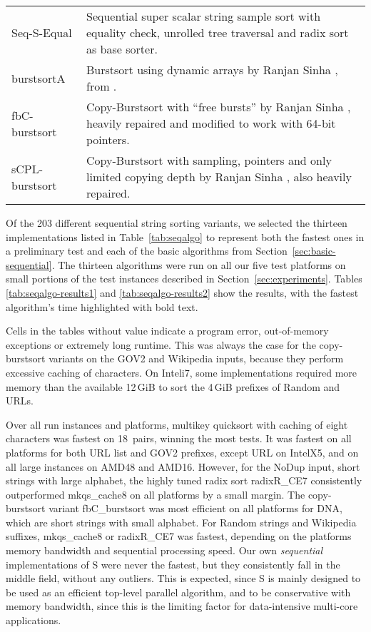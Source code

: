 \documentclass[a4paper]{myjournal}
\begin{document}
\begin{table}[tb]
\begin{tabularx}{\linewidth}{l|X}
Seq-S-Equal  & Sequential super scalar string sample sort with equality check, unrolled tree traversal and radix sort as base sorter.                                        \\
burstsortA       & Burstsort using dynamic arrays by Ranjan Sinha \cite{sinha2004cache-conscious}, from \cite{rantala2007web}.                                                   \\
fbC-burstsort    & Copy-Burstsort with ``free bursts'' by Ranjan Sinha \cite{sinha2007cache-efficient}, heavily repaired and modified to work with 64-bit pointers.              \\
sCPL-burstsort   & Copy-Burstsort with sampling, pointers and only limited copying depth by Ranjan Sinha \cite{sinha2007cache-efficient}, also heavily repaired.                 \\
\end{tabularx}
\end{table}

Of the 203 different sequential string sorting variants, we selected the
thirteen implementations listed in Table~\ref{tab:seqalgo} to represent both the
fastest ones in a preliminary test and each of the basic algorithms from
Section~\ref{sec:basic-sequential}. The thirteen algorithms were run on all our
five test platforms on small portions of the test instances described in
Section~\ref{sec:experiments}. Tables \ref{tab:seqalgo-results1} and
\ref{tab:seqalgo-results2} show the results, with the fastest algorithm's time
highlighted with bold text.

Cells in the tables without value indicate a program error, out-of-memory
exceptions or extremely long runtime. This was always the case for the
copy-burstsort variants on the GOV2 and Wikipedia inputs, because they perform
excessive caching of characters. On Inteli7, some implementations required more
memory than the available 12\,GiB to sort the 4\,GiB prefixes of Random and URLs.

Over all run instances and platforms, multikey quicksort with caching of eight
characters was fastest on 18~pairs, winning the most tests. It was fastest on
all platforms for both URL list and GOV2 prefixes, except URL on IntelX5, and on
all large instances on AMD48 and AMD16. However, for the NoDup input, short
strings with large alphabet, the highly tuned radix sort radixR\_CE7
consistently outperformed mkqs\_cache8 on all platforms by a small margin. The
copy-burstsort variant fbC\_burstsort was most efficient on all platforms for
DNA, which are short strings with small alphabet. For Random strings and
Wikipedia suffixes, mkqs\_cache8 or radixR\_CE7 was fastest, depending on the
platforms memory bandwidth and sequential processing speed.  Our own
\emph{sequential} implementations of S were never the fastest, but they
consistently fall in the middle field, without any outliers.  This is expected,
since S is mainly designed to be used as an efficient top-level parallel
algorithm, and to be conservative with memory bandwidth, since this is the
limiting factor for data-intensive multi-core applications.
\end{document}
